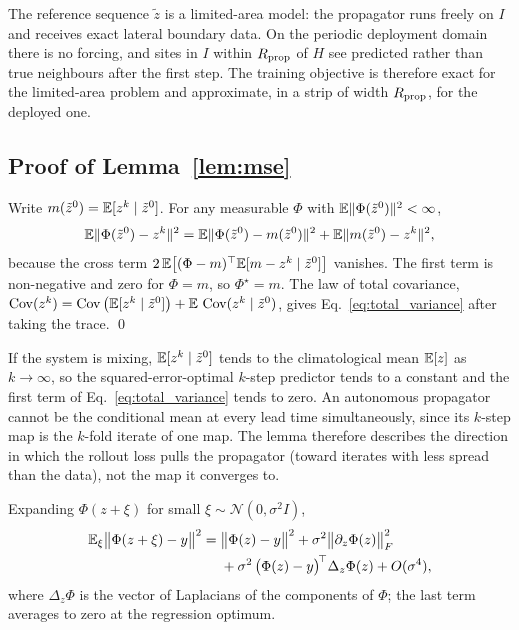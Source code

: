 \begin{remark}
The reference sequence $\tilde z$ is a limited-area model: the
propagator runs freely on $I$ and receives exact lateral boundary data.
On the periodic deployment domain there is no forcing, and sites in $I$
within $R_{\mathrm{prop}}$ of $H$ see predicted rather than true neighbours after
the first step. The training objective is therefore exact for the
limited-area problem and approximate, in a strip of width $R_{\mathrm{prop}}$, for
the deployed one.
\end{remark}

\subsection{Proof of Lemma~\ref{lem:mse}}

Write $m(\tilde z^0)=\mathbb{E}[z^k\mid\tilde z^0]$. For any measurable $\Phi$
with $\mathbb{E}\|\Phi(\tilde z^0)\|^2<\infty$,
\[
  \mathbb{E}\|\Phi(\tilde z^0)-z^k\|^2
  = \mathbb{E}\|\Phi(\tilde z^0)-m(\tilde z^0)\|^2
  + \mathbb{E}\|m(\tilde z^0)-z^k\|^2,
\]
because the cross term
$2\,\mathbb{E}\big[(\Phi-m)^{\top}\mathbb{E}[m-z^k\mid\tilde z^0]\big]$ vanishes. The
first term is non-negative and zero for $\Phi=m$, so $\Phi^\star=m$. The
law of total covariance,
$\operatorname{Cov}(z^k)=\operatorname{Cov}\big(\mathbb{E}[z^k\mid\tilde z^0]\big)+\mathbb{E}\,\operatorname{Cov}(z^k\mid\tilde z^0)$,
gives Eq.~\eqref{eq:total_variance} after taking the trace. \qed

\begin{remark}
\label{rem:mse_limits}
If the system is mixing, $\mathbb{E}[z^k\mid\tilde z^0]$ tends to the
climatological mean $\mathbb{E}[z]$ as $k\to\infty$, so the squared-error-optimal
$k$-step predictor tends to a constant and the first term of
Eq.~\eqref{eq:total_variance} tends to zero. An autonomous propagator
cannot be the conditional mean at every lead time simultaneously, since
its $k$-step map is the $k$-fold iterate of one map. The lemma therefore
describes the direction in which the rollout loss pulls the propagator
(toward iterates with less spread than the data), not the map it
converges to.
\end{remark}

 Expanding
$\Phi(z+\xi)$ for small $\xi\sim\mathcal N(0,\sigma^2 I)$,
\begin{equation}
\begin{split}
  \mathbb{E}_\xi\big\|\Phi(z+\xi)-y\big\|^2
  ={}& \big\|\Phi(z)-y\big\|^2 + \sigma^2\big\|\partial_z\Phi(z)\big\|_F^2\\
  &+ \sigma^2\,\big(\Phi(z)-y\big)^{\!\top}\Delta_z\Phi(z) + O(\sigma^4),
\end{split}
  \label{eq:noise_penalty}
\end{equation}
where $\Delta_z\Phi$ is the vector of Laplacians of the components of
$\Phi$; the last term averages to zero at the regression optimum.

